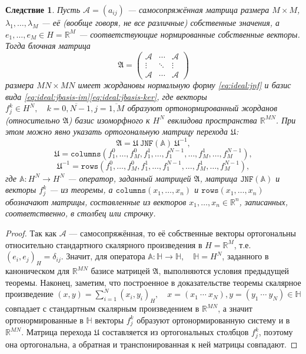 \documentclass[a4paper]{article}
\newtheorem{corollary}{Следствие}
\begin{document}
 \begin{corollary}
     Пусть \( \mathcal{A} = (a_{ij}) \) --- самосопряжённая матрица размера \( M\times M \),
     \( \lambda_1, \ldots, \lambda_M \) --- её (вообще говоря, не все различные) собственные значения,
     а \( e_1, \ldots, e_M \in H=\mathbb{R}^M \) --- соответствующие нормированные собственные векторы.
     Тогда блочная матрица
     \[ \mathfrak{A} = \begin{pmatrix}
         \mathcal{A} & \cdots & \mathcal{A} \\
         \vdots & \ddots & \vdots \\
         \mathcal{A} & \cdots & \mathcal{A}
     \end{pmatrix} \]
     размера \( MN\times MN \) имеет жордановы нормальную форму \eqref{eq:ideal:jnf}
     и базис вида \eqref{eq:ideal:jbasis-im}\eqref{eq:ideal:jbasis-ker},
     где векторы \( f_j^k\in H^N,\quad k=\overline{0,N-1},j=\overline{1,M} \)
     образуют ортонормированный жорданов (относительно \( \mathfrak{A} \))
     базис изоморфного к \( H^N \) евклидова пространства \( \mathbb{R}^{MN} \).
     При этом можно явно указать ортогональную матрицу перехода \( \mathfrak{U} \):
     \[
         \mathfrak{A} = \mathfrak{U} ~ \mathtt{JNF}(\mathbb{A}) ~ \mathfrak{U}^{-1}, \]
    \[ \mathfrak{U} = \mathtt{columns}(f_1^0,\ldots,f_M^0,f_1^1,\ldots,f_1^{N-1},\ldots,f_M^1,\ldots,f_M^{N-1}), \]
    \[ \mathfrak{U}^{-1} = \mathtt{rows}(f_1^0,\ldots,f_M^0,f_1^1,\ldots,f_1^{N-1},\ldots,f_M^1,\ldots,f_M^{N-1}), \]
     где \( \mathbb{A}:H^N\to H^N \) --- оператор, заданный матрицей \( \mathfrak{A} \),
     матрица \( \mathtt{JNF(\mathbb{A})} \) и векторы \( f_j^k \) --- из теоремы,
     а \( \mathtt{columns}(x_1,\ldots,x_n) \) и \( \mathtt{rows}(x_1,\ldots,x_n) \) обозначают матрицы,
     составленные из векторов \( x_1, \ldots, x_n \in \mathbb{R}^n \),
     записанных, соответственно, в столбец или строчку.
 \end{corollary}
 \begin{proof}
     Так как \( \mathcal{A} \) --- самосопряжённая,
     то её собственные векторы ортогональны относительно стандартного скалярного произведения в \( H=\mathbb{R}^M \),
     т.е. \( (e_i, e_j)_H = \delta_{ij} \).
     Значит, для оператора \( \mathbb{A}:\mathbb{H}\to\mathbb{H}, \quad \mathbb{H}=H^N \),
     заданного в каноническом для \( \mathbb{R}^{MN} \) базисе матрицей \( \mathfrak{A} \),
     выполняются условия предыдущей теоремы.
     Наконец, заметим, что построенное в доказательстве теоремы
     скалярное произведение \( (x,y) = \sum_{i=1}^N (x_i, y_i)_H, \quad x=(x_1~\cdots~x_N),y=(y_1~\cdots~y_N)\in\mathbb{H} \)
     совпадает с стандартным скалярным произведением в \( \mathbb{R}^{MN} \),
     а значит ортонормированные в \( \mathbb{H} \) векторы \( f_j^k \)
     образуют ортонормированную систему и в \( \mathbb{R}^{MN} \).
     Матрица перехода \( \mathfrak{U} \) составляется из ортогональных столбцов \( f_j^k \),
     поэтому она ортогональна, а обратная и транспонированная к ней матрицы совпадают.
 \end{proof}
\end{document}

